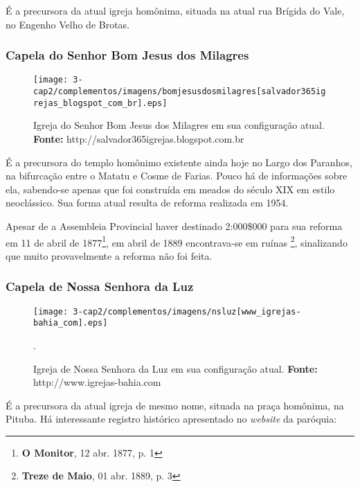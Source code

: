 É a precursora da atual igreja homônima, situada na atual rua Brígida do Vale, no Engenho Velho de Brotas. 

\subsubsection{Capela do Senhor Bom Jesus dos Milagres}

\begin{figure}[!htp]
\centering
\texttt{[image: 3-cap2/complementos/imagens/bomjesusdosmilagres[salvador365igrejas\_blogspot\_com\_br].eps]} 
\caption{Igreja do Senhor Bom Jesus dos Milagres em sua configuração atual. \textbf{Fonte:} http://salvador365igrejas.blogspot.com.br}
\end{figure}

É a precursora do templo homônimo existente ainda hoje no Largo dos Paranhos, na bifurcação entre o Matatu e Cosme de Farias. Pouco há de informações sobre ela, sabendo-se apenas que foi construída em meados do século XIX em estilo neoclássico. Sua forma atual resulta de reforma realizada em 1954.

Apesar de a Assembleia Provincial haver destinado 2:000\$000 para sua reforma em 11 de abril de 1877\footnote{\textbf{O Monitor}, 12 abr. 1877, p. 1}, em abril de 1889 encontrava-se em ruínas \footnote{\textbf{Treze de Maio}, 01 abr. 1889, p. 3}, sinalizando que muito provavelmente a reforma não foi feita.

\subsubsection{Capela de Nossa Senhora da Luz}

\begin{figure}[!htp]
\centering
\texttt{[image: 3-cap2/complementos/imagens/nsluz[www\_igrejas-bahia\_com].eps]} 
\caption{Igreja de Nossa Senhora da Luz em sua configuração atual. \textbf{Fonte:} http://www.igrejas-bahia.com}.
\end{figure}

É a precursora da atual igreja de mesmo nome, situada na praça homônima, na Pituba. Há interessante registro histórico apresentado no \textit{website} da paróquia:

